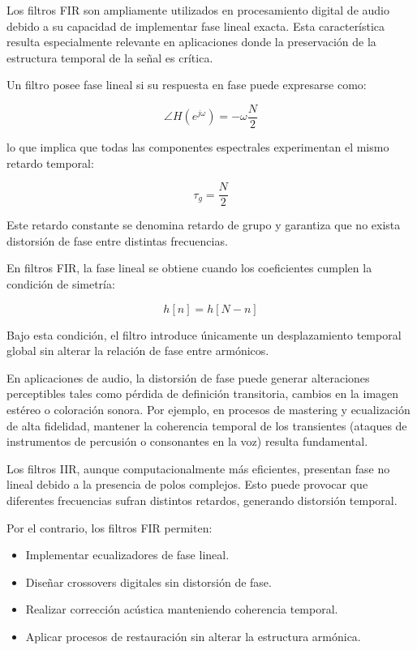 \documentclass[a4,11pt]{article}
\begin{document}
Los filtros FIR son ampliamente utilizados en procesamiento digital de audio debido a su capacidad de implementar fase lineal exacta. Esta característica resulta especialmente relevante en aplicaciones donde la preservación de la estructura temporal de la señal es crítica.

Un filtro posee fase lineal si su respuesta en fase puede expresarse como:

\begin{equation}
\angle H(e^{j\omega}) = -\omega \frac{N}{2}
\label{eq:fase_lineal}
\end{equation}

lo que implica que todas las componentes espectrales experimentan el mismo retardo temporal:

\begin{equation}
\tau_g = \frac{N}{2}
\label{eq:retardo_grupo}
\end{equation}

Este retardo constante se denomina retardo de grupo y garantiza que no exista distorsión de fase entre distintas frecuencias.

En filtros FIR, la fase lineal se obtiene cuando los coeficientes cumplen la condición de simetría:

\begin{equation}
h[n] = h[N-n]
\label{eq:simetria_fir}
\end{equation}

Bajo esta condición, el filtro introduce únicamente un desplazamiento temporal global sin alterar la relación de fase entre armónicos.

En aplicaciones de audio, la distorsión de fase puede generar alteraciones perceptibles tales como pérdida de definición transitoria, cambios en la imagen estéreo o coloración sonora. Por ejemplo, en procesos de mastering y ecualización de alta fidelidad, mantener la coherencia temporal de los transientes (ataques de instrumentos de percusión o consonantes en la voz) resulta fundamental.

Los filtros IIR, aunque computacionalmente más eficientes, presentan fase no lineal debido a la presencia de polos complejos. Esto puede provocar que diferentes frecuencias sufran distintos retardos, generando distorsión temporal.

Por el contrario, los filtros FIR permiten:

\begin{itemize}
\item Implementar ecualizadores de fase lineal.
\item Diseñar crossovers digitales sin distorsión de fase.
\item Realizar corrección acústica manteniendo coherencia temporal.
\item Aplicar procesos de restauración sin alterar la estructura armónica.
\end{itemize}
\end{document}
